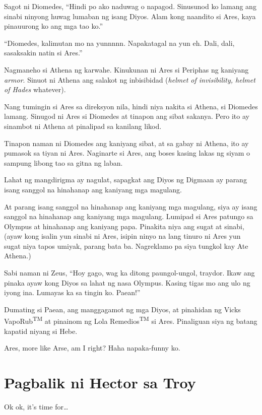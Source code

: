 \documentclass[12pt,letterpaper]{report}
\begin{document}
Sagot ni Diomedes, ``Hindi po ako naduwag o napagod. Sinusunod ko lamang ang sinabi ninyong huwag lumaban ng isang Diyos. Alam kong naandito si Ares, kaya pinauurong ko ang mga tao ko.''

``Diomedes, kalimutan mo na yunnnnn. Napakatagal na yun eh. Dali, dali, sasaksakin natin si Ares.''

Nagmaneho si Athena ng karwahe. Kinukunan ni Ares si Periphas ng kaniyang \textit{armor}. Sinuot ni Athena ang salakot ng inbisibidad (\textit{helmet of invisibility, helmet of Hades} whatever).

Nang tumingin si Ares sa direksyon nila, hindi niya nakita si Athena, si Diomedes lamang. Sinugod ni Ares si Diomedes at tinapon ang sibat sakanya. Pero ito ay sinambot ni Athena at pinalipad sa kanilang likod.

Tinapon naman ni Diomedes ang kaniyang sibat, at sa gabay ni Athena, ito ay pumasok sa tiyan ni Ares. Naginarte si Ares, ang boses kasing lakas ng siyam o sampung libong tao sa gitna ng laban.

Lahat ng mangdirigma ay nagulat, sapagkat ang Diyos ng Digmaan ay parang isang sanggol na hinahanap ang kaniyang mga magulang.

At parang isang sanggol na hinahanap ang kaniyang mga magulang, siya ay isang sanggol na hinahanap ang kaniyang mga magulang. Lumipad si Ares patungo sa Olympus at hinahanap ang kaniyang papa. Pinakita niya ang sugat at sinabi, (ayaw kong isalin yun sinabi ni Ares, isipin ninyo na lang tinuro ni Ares yun sugat niya tapos umiyak, parang bata ba. Nagreklamo pa siya tungkol kay Ate Athena.)

Sabi naman ni Zeus, ``Hoy gago, wag ka ditong paungol-ungol, traydor. Ikaw ang pinaka ayaw kong Diyos sa lahat ng nasa Olympus. Kasing tigas mo ang ulo ng iyong ina. Lumayas ka sa tingin ko. Paean!''

Dumating si Paean, ang manggagamot ng mga Diyos, at pinahidan ng Vicks VapoRub\textsuperscript{TM} at pinainom ng Lola Remedios\textsuperscript{TM} si Ares. Pinaliguan siya ng batang kapatid niyang si Hebe.

Ares, more like Arse, am I right? Haha napaka-funny ko. \pagebreak
\chapter{Pagbalik ni Hector sa Troy}

Ok ok, it's time for\dots
\end{document}
